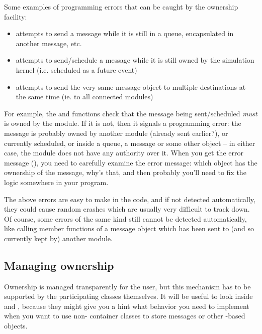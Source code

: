 Some examples of programming errors that can be caught
by the ownership facility:

\begin{itemize}
    \item{attempts to send a message while it is still in a queue,
    encapsulated in another message, etc.}

    \item{attempts to send/schedule a message while it is still owned
    by the simulation kernel (i.e. scheduled as a future event)}

    \item{attempts to send the very same message object to multiple
    destinations at the same time (ie. to all connected modules)}
\end{itemize}

For example, the  and  functions check
that the message being sent/scheduled \textit{must} is owned by the module.
If it is not, then it signals a programming error: the message is probably
owned by another module (already sent earlier?), or currently scheduled, or
inside a queue, a message or some other object -- in either case, the
module does not have any authority over it. When you get the error message
(), you need to carefully examine the error
message: which object has the ownership of the message, why's that, and
then probably you'll need to fix the logic somewhere in your program.

The above errors are easy to make in the code, and if not detected
automatically, they could cause random crashes which are usually very
difficult to track down. Of course, some errors of the same kind still
cannot be detected automatically, like calling member functions of a
message object which has been sent to (and so currently kept by) another
module.


\subsection{Managing ownership}

Ownership is managed transparently for the user, but this mechanism
has to be supported by the participating classes themselves.
It will be useful to look inside  and ,
because they might give you a hint what behavior you need
to implement when you want to use non-{\opp} container classes
to store messages or other -based objects.



